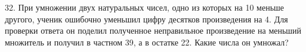 32. При умножении двух натуральных чисел, одно из которых на 10 меньше другого, ученик ошибочно уменьшил цифру десятков произведения на 4. Для проверки ответа он поделил полученное неправильное произведение на меньший множитель и получил в частном 39, а в остатке 22. Какие числа он умножал?\\
